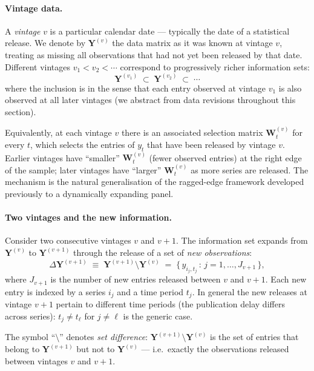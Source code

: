 \documentclass[11pt, a4paper, oneside]{article}
\begin{document}
\paragraph{Vintage data.}
A \emph{vintage} $v$ is a particular calendar date — typically the
date of a statistical release. We denote by $\mathbf{Y}^{(v)}$ the
data matrix as it was known at vintage $v$, treating as missing all
observations that had not yet been released by that date. Different
vintages $v_1 < v_2 < \cdots$ correspond to progressively richer
information sets:
\[
\mathbf{Y}^{(v_1)} \;\subset\; \mathbf{Y}^{(v_2)} \;\subset\; \cdots
\]
where the inclusion is in the sense that each entry observed at
vintage $v_1$ is also observed at all later vintages (we abstract
from data revisions throughout this section).

Equivalently, at each vintage $v$ there is an associated selection
matrix $\mathbf{W}_t^{(v)}$ for every $t$, which selects the entries
of $y_t$ that have been released by vintage $v$. Earlier vintages
have ``smaller'' $\mathbf{W}_t^{(v)}$ (fewer observed entries) at the
right edge of the sample; later vintages have ``larger''
$\mathbf{W}_t^{(v)}$ as more series are released. The mechanism is
the natural generalisation of the ragged-edge framework developed previously to a dynamically expanding panel.

\paragraph{Two vintages and the new information.}
Consider two consecutive vintages $v$ and $v+1$. The information set
expands from $\mathbf{Y}^{(v)}$ to $\mathbf{Y}^{(v+1)}$ through the
release of a set of \emph{new observations}:
\begin{equation}
\Delta \mathbf{Y}^{(v+1)} \;\equiv\; \mathbf{Y}^{(v+1)} \setminus \mathbf{Y}^{(v)}
\;=\; \big\{\, y_{i_j, t_j} \,:\, j = 1, \ldots, J_{v+1} \,\big\},
\label{eq:new-releases}
\end{equation}
where $J_{v+1}$ is the number of new entries released between $v$
and $v+1$. Each new entry is indexed by a series $i_j$ and a time
period $t_j$. In general the new releases at vintage $v+1$ pertain
to different time periods (the publication delay differs across
series): $t_j \neq t_\ell$ for $j \neq \ell$ is the generic case.

The symbol ``$\setminus$'' denotes \emph{set difference}: 
$\mathbf{Y}^{(v+1)} \setminus \mathbf{Y}^{(v)}$ is the set of entries 
that belong to $\mathbf{Y}^{(v+1)}$ but not to $\mathbf{Y}^{(v)}$ —
i.e.\ exactly the observations released between vintages $v$ and 
$v+1$.
\end{document}
